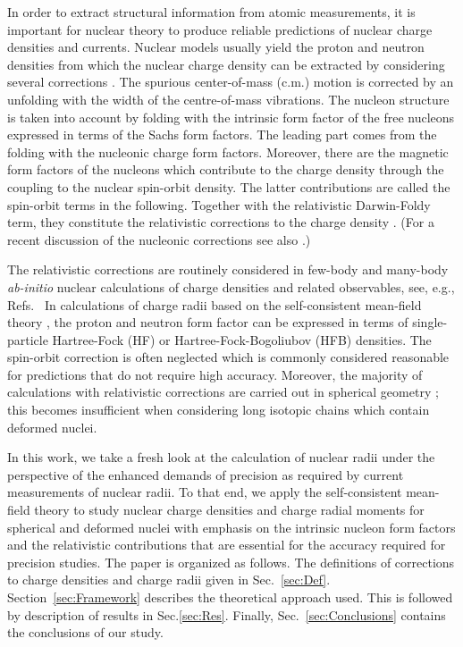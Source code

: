 \documentclass[aps,prc,twocolumn,floatfix,nofootinbib,preprintnumbers,superscriptaddress,longbibliography]{revtex4-1}
\begin{document}
In order to extract structural information from atomic measurements, it is important for nuclear theory to produce reliable predictions of nuclear charge densities and currents.
Nuclear models usually  yield  the proton and neutron densities from which  the nuclear charge density can be extracted by considering  several corrections  \cite{Friar1975,Friedrich1986}.
The spurious  center-of-mass  (c.m.) motion  is corrected by an unfolding with the width of the centre-of-mass vibrations.
The nucleon structure is taken into account  by folding with the intrinsic form factor of the free nucleons expressed in terms of the Sachs form factors. The leading part comes from the folding with the nucleonic charge form factors. Moreover, there are the magnetic form factors of
the nucleons which contribute to the charge density through the coupling to the nuclear spin-orbit density.  The latter contributions are called  the spin-orbit terms in the following.  Together with the relativistic Darwin-Foldy term, they  constitute the relativistic corrections to the charge density
\cite{deForest1966,Bertozzi1972,Friar1975,Friar1973,Martorell1980,Friar1997}. (For a recent discussion of the nucleonic corrections see also \cite{Lorce:2020onh}.)

The relativistic corrections are routinely considered in
few-body and many-body \emph{ab-initio} nuclear calculations of charge densities and related observables, see, e.g., Refs.~\cite{Hagen2016,Hoferichter2020}
In calculations of charge radii based on the self-consistent mean-field theory
\cite{Friedrich1986,Reinhard1989,Bender2003,Reinhard2013},
the proton  and neutron form factor can be expressed in terms of single-particle Hartree-Fock (HF) or Hartree-Fock-Bogoliubov (HFB) densities. The  spin-orbit correction is often neglected
\cite{Liang2018,Viatkina2019,Allehabi2020,Allehabi2020a} which is commonly considered reasonable for predictions that do not require high accuracy.
Moreover, the majority of calculations with relativistic corrections are
carried out in spherical geometry  \cite{Ong2010,Horowitz2012,Kurasawa2019,Kurasawa2020};  this becomes insufficient when considering  long isotopic chains which contain  deformed nuclei.

In this work, we take a fresh look at the calculation of nuclear radii under the perspective of the enhanced demands of precision as required by current measurements of nuclear radii. To that end, we apply the self-consistent mean-field theory to study nuclear charge densities and charge radial moments for spherical and deformed nuclei with emphasis on the  intrinsic nucleon form factors and the relativistic contributions  that are essential for the accuracy required for precision studies. The paper is organized as follows. The definitions of corrections to charge densities and charge radii given in Sec.~\ref{sec:Def}.
Section~\ref{sec:Framework} describes the theoretical approach used. This is followed by description of results in Sec.\ref{sec:Res}. Finally, Sec.~\ref{sec:Conclusions} contains the conclusions of our study.
\end{document}
